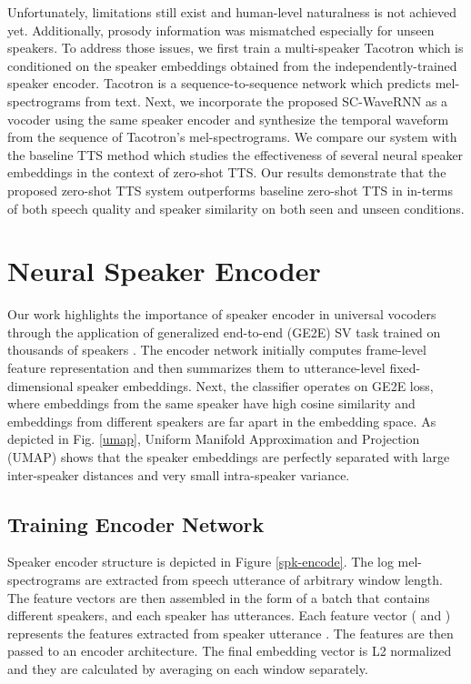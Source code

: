 \documentclass[a4paper]{article}
\begin{document}
Unfortunately, limitations still exist and human-level naturalness is not achieved yet. Additionally, prosody information was mismatched especially for unseen speakers. To address those issues, we first train a multi-speaker Tacotron which is conditioned on the speaker embeddings obtained from the independently-trained speaker encoder. Tacotron \cite{wang2017tacotron} is a sequence-to-sequence network which predicts mel-spectrograms from text. Next, we incorporate the proposed SC-WaveRNN as a vocoder using the same speaker encoder and synthesize the temporal waveform from the sequence of Tacotron's mel-spectrograms. We compare our system with the baseline TTS method \cite{cooper2019zero} which studies the effectiveness of several neural speaker embeddings in the context of zero-shot TTS. Our results demonstrate that the proposed zero-shot TTS system outperforms baseline zero-shot TTS in \cite{cooper2019zero} in-terms of both speech quality and speaker similarity on both seen and unseen conditions.



\vspace{-2mm}
\section{Neural Speaker Encoder}

Our work highlights the importance of speaker encoder in universal vocoders through the application of generalized end-to-end (GE2E) SV task trained on thousands of speakers \cite{wan2018generalized}.
The encoder network initially computes frame-level feature representation and then summarizes them to utterance-level fixed-dimensional speaker embeddings. Next, the classifier operates on GE2E loss, where embeddings from the same speaker have high cosine similarity and embeddings from different speakers are far apart in the embedding space. As depicted in Fig. \ref{umap}, Uniform Manifold Approximation and Projection (UMAP) shows that the speaker embeddings are perfectly separated with large inter-speaker distances and very small intra-speaker variance.
\vspace{-1mm}
\subsection{Training Encoder Network}
Speaker encoder structure is depicted in Figure \ref{spk-encode}. The log mel-spectrograms are extracted from speech utterance of arbitrary window length. The feature vectors are then assembled in the form of a batch that contains  different speakers, and each speaker has  utterances. Each feature vector  ( and ) represents the features extracted from speaker  utterance . The features  are then passed to an encoder architecture. The final embedding vector  is L2 normalized and they are calculated by averaging on each window separately.
\end{document}
